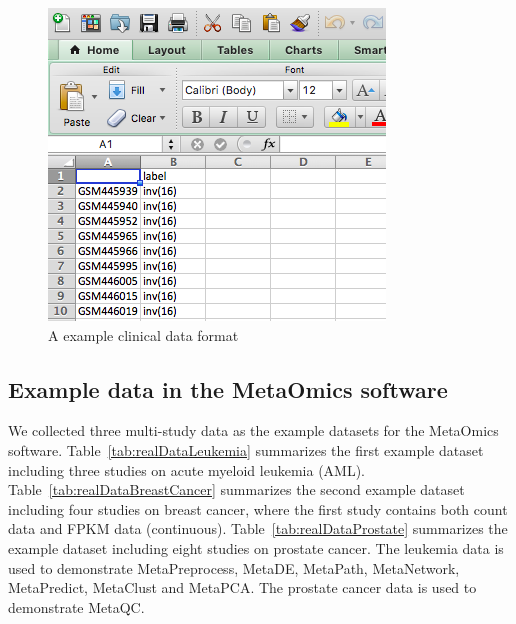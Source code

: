 \begin{figure}[H]
\begin{center}
\includegraphics[scale=0.5]{./figure/dataPreparation/clinicalData}
\caption{A example clinical data format}
\label{fig:clinical}
\end{center}
\end{figure}

\subsection{Example data in the MetaOmics software}


We collected three multi-study data as the example datasets for the MetaOmics software.
Table~\ref{tab:realDataLeukemia} summarizes the first example dataset including three studies on acute myeloid leukemia (AML).
Table~\ref{tab:realDataBreastCancer} summarizes the second example dataset including four studies on breast cancer, where the first study contains both count data and FPKM data (continuous).
Table~\ref{tab:realDataProstate} summarizes the example dataset including eight studies on prostate cancer.
The leukemia data is used to demonstrate MetaPreprocess, MetaDE, MetaPath, MetaNetwork, MetaPredict, MetaClust and MetaPCA.
The prostate cancer data is used to demonstrate MetaQC.


